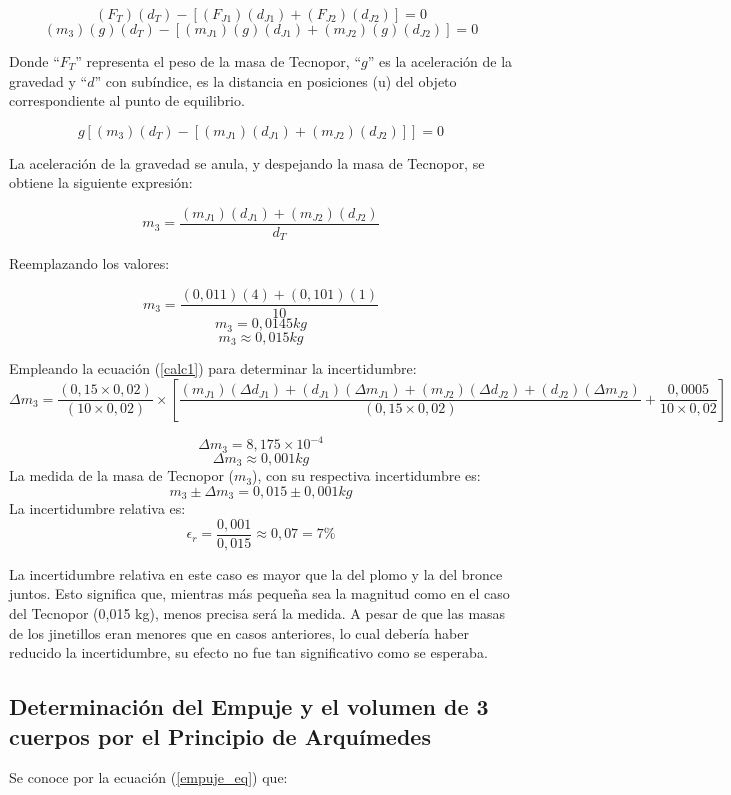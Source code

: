 \documentclass[../main.tex]{subfiles}
\begin{document}
\[(F_T)(d_T )-[(F_{J1} )(d_{J1} )+(F_{J2} )(d_{J2} )]=0\]
\[(m_3)(g)(d_T )-[(m_{J1} )(g)(d_{J1} )+(m_{J2} )(g)(d_{J2} )]=0\]

Donde “$F_T$” representa el peso de la masa de Tecnopor, “$g$”
es la aceleración de la gravedad y “$d$” con subíndice,
es la distancia en posiciones (u) del objeto correspondiente al 
punto de equilibrio.

\[g[(m_3)(d_T )-[(m_{J1} )(d_{J1} )+(m_{J2} )(d_{J2} )]]=0\]

La aceleración de la gravedad se anula, y despejando la masa de 
Tecnopor, 
se obtiene la siguiente expresión:

\begin{equation*}
    m_3=\frac{(m_{J1} )(d_{J1} )+(m_{J2} )(d_{J2} )}{d_T} 
\end{equation*}

Reemplazando los valores:

\[m_3=\frac{(0,011)(4)+(0,101)(1)}{10}\]
\[m_3=0,0145 kg\]
\[m_3\approx0,015 kg\]

Empleando la ecuación (\ref{calc1}) para determinar la incertidumbre:
\begin{equation*}
    \Delta m_3=\frac{(0,15\times0,02)}{(10\times0,02)}\times
    \left[\frac{(m_{J1} )(\Delta d_{J1} )+(d_{J1} )(\Delta m_{J1} )+
    (m_{J2} )(\Delta d_{J2} )+(d_{J2} )(\Delta m_{J2} )}{(0,15\times0,02)}
    +\frac{0,0005}{10\times0,02}\right]
\end{equation*}

\[\Delta m_3=8,175\times10^{-4}\]
\[\Delta m_3\approx0,001 kg\]
La medida de la masa de Tecnopor ($m_3$), 
con su respectiva incertidumbre es:
\[m_3\pm\Delta m_3=0,015\pm0,001 kg\]
La incertidumbre relativa es:
\[\epsilon_r=\frac{0,001}{0,015}\approx0,07=7\%\]

La incertidumbre relativa en este caso es mayor que la del plomo 
y la del bronce juntos. Esto significa que, mientras más 
pequeña sea la magnitud como en el caso del 
Tecnopor (0,015 kg), menos precisa será la medida. 
A pesar de que las masas de los jinetillos eran menores que en 
casos anteriores, lo cual debería haber reducido la incertidumbre, 
su efecto no fue tan significativo como se esperaba.

\subsection{Determinación del Empuje y el volumen de 3 cuerpos por el Principio de Arquímedes}

Se conoce por la ecuación (\ref{empuje_eq}) que:
\end{document}
